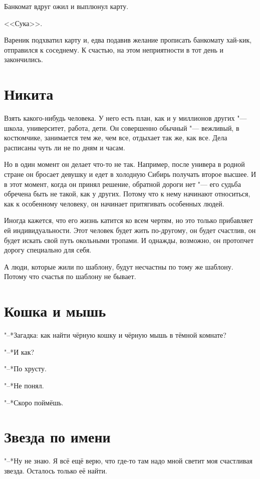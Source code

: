Банкомат вдруг ожил и выплюнул карту.

<<Сука>>.

Вареник подхватил карту и, едва подавив желание прописать банкомату хай-кик, отправился к соседнему.
К счастью, на этом неприятности в тот день и закончились.

\section{Никита}

Взять какого-нибудь человека.
У него есть план, как и у миллионов других "--- школа, университет, работа, дети.
Он совершенно обычный "--- вежливый, в костюмчике, занимается тем же, чем все, отдыхает так же, как все.
Дела расписаны чуть ли не по дням и часам.

Но в один момент он делает что-то не так.
Например, после универа в родной стране он бросает девушку и едет в холодную Сибирь получать второе высшее.
И в этот момент, когда он принял решение, обратной дороги нет "--- его судьба обречена быть не такой, как у других.
Потому что к нему начинают относиться, как к особенному человеку, он начинает притягивать особенных людей.

Иногда кажется, что его жизнь катится ко всем чертям, но это только прибавляет ей индивидуальности.
Этот человек будет жить по-другому, он будет счастлив, он будет искать свой путь окольными тропами.
И однажды, возможно, он протопчет дорогу специально для себя.

А люди, которые жили по шаблону, будут несчастны по тому же шаблону.
Потому что счастья по шаблону не бывает.

\section{Кошка и мышь}

"--*Загадка: как найти чёрную кошку и чёрную мышь в тёмной комнате?

"--*И как?

"--*По хрусту.

"--*Не понял.

"--*Скоро поймёшь.

\section{Звезда по имени}

"--*Ну не знаю.
Я всё ещё верю, что где-то там надо мной светит моя счастливая звезда.
Осталось только её найти.

